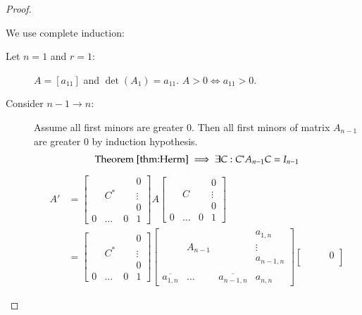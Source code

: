 \documentclass[a4paper]{article}
\numberwithin{lecref}{section}
\begin{document}
\begin{proof}
\begin{description}
      We use complete induction:
      \begin{description}
        \item[Let $n=1$ and $r=1$:]
          $A = [a_{11}]$ and $\det(A_1) = a_{11}$.
          $A > 0 \iff a_{11} > 0$.
        \item[Consider $n-1 \to n$:]
          Assume all first minors are greater $0$.
          Then all first minors of matrix $A_{n-1}$ are greater $0$ by induction hypothesis.
          \[ \text{Theorem~\ref{thm:Herm}} \implies \exists C: C^* A_{n - 1} C = I_{n-1} \]
          \begin{align*}
            A' &= \begin{bmatrix}
                      &       &   & 0 \\
                      & C^*   &   & \vdots \\
                      &       &   & 0 \\
                    0 & \dots & 0 & 1
                  \end{bmatrix}
                  A
                  \begin{bmatrix}
                      &       &   & 0 \\
                      & C     &   & \vdots \\
                      &       &   & 0 \\
                    0 & \dots & 0 & 1
                  \end{bmatrix} \\
                  &= \begin{bmatrix}
                      &       &   & 0 \\
                      & C^*   &   & \vdots \\
                      &       &   & 0 \\
                    0 & \dots & 0 & 1
                  \end{bmatrix} \begin{bmatrix}
                      & & & a_{1, n} \\
                      & A_{n-1} & & \vdots \\
                      & & & a_{n-1,n} \\ \\
                    \overline{a_{1,n}} & \ldots & \overline{a_{n-1,n}} & a_{n,n}
                  \end{bmatrix} \begin{bmatrix}
                      &       &   & 0 \\

\end{bmatrix}
\end{align*}
\end{description}
\end{description}
\end{proof}
\end{document}
